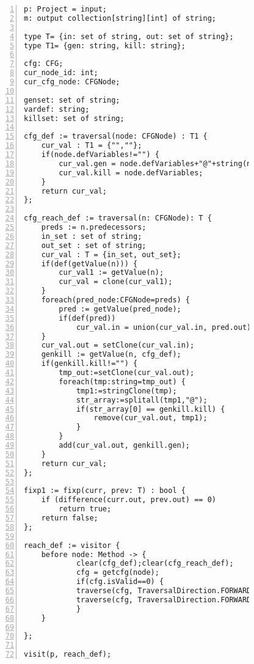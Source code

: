 \begin{figure}[ht!]
\begin{lstlisting}[numbers=left, tabsize=4, caption={Reaching definition analysis},label={lst:rd-code},lastline=59] 
p: Project = input;
m: output collection[string][int] of string;

type T= {in: set of string, out: set of string};
type T1= {gen: string, kill: string};

cfg: CFG;
cur_node_id: int;
cur_cfg_node: CFGNode;

genset: set of string;
vardef: string;
killset: set of string;

cfg_def := traversal(node: CFGNode) : T1 {
	cur_val : T1 = {"",""};
	if(node.defVariables!="") {
		cur_val.gen = node.defVariables+"@"+string(node.id);
		cur_val.kill = node.defVariables;
	}
	return cur_val;
};

cfg_reach_def := traversal(n: CFGNode): T {
	preds := n.predecessors;
	in_set : set of string;
	out_set : set of string;
	cur_val : T = {in_set, out_set};
	if(def(getValue(n))) {
		cur_val1 := getValue(n);
		cur_val = clone(cur_val1);
	}
	foreach(pred_node:CFGNode=preds) {	
		pred := getValue(pred_node);
		if(def(pred))
			cur_val.in = union(cur_val.in, pred.out);
	}
	cur_val.out = setClone(cur_val.in);
	genkill := getValue(n, cfg_def);
	if(genkill.kill!="") {
		tmp_out:=setClone(cur_val.out);
		foreach(tmp:string=tmp_out) {
			tmp1:=stringClone(tmp);
			str_array:=splitall(tmp1,"@");
			if(str_array[0] == genkill.kill) {
				remove(cur_val.out, tmp1);
			}
		}
		add(cur_val.out, genkill.gen);
	}
	return cur_val;
};

fixp1 := fixp(curr, prev: T) : bool {
	if (difference(curr.out, prev.out) == 0)
		return true;	
	return false;
};

reach_def := visitor {
	before node: Method -> {
			clear(cfg_def);clear(cfg_reach_def);
			cfg = getcfg(node);
			if(cfg.isValid==0) {
			traverse(cfg, TraversalDirection.FORWARD, TraversalKind.ITERATIVE, cfg_def);
			traverse(cfg, TraversalDirection.FORWARD, TraversalKind.HYBRID, cfg_reach_def, fixp1);
			}
	}

};

visit(p, reach_def);
\end{lstlisting}
\end{figure}
